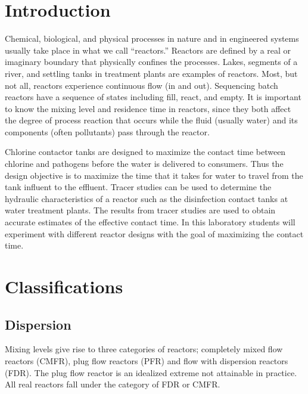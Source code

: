 \documentclass[letterpaper,10pt,english]{sphinxmanual}
\begin{document}
\section{Introduction}
\label{\detokenize{Reactor_Characteristics/Reactor_Characteristics:introduction}}\label{\detokenize{Reactor_Characteristics/Reactor_Characteristics:heading-reactor-introduction}}
Chemical, biological, and physical processes in nature and in engineered systems usually take place in what we call “reactors.” Reactors are defined by a real or imaginary boundary that physically confines the processes. Lakes, segments of a river, and settling tanks in treatment plants are examples of reactors. Most, but not all, reactors experience continuous flow (in and out). Sequencing batch reactors have a sequence of states including fill, react, and empty. It is important to know the mixing level and residence time in reactors, since they both affect the degree of process reaction that occurs while the fluid (usually water) and its components (often pollutants) pass through the reactor.

Chlorine contactor tanks are designed to maximize the contact time between chlorine and pathogens before the water is delivered to consumers. Thus the design objective is to maximize the time that it takes for water to travel from the tank influent to the effluent. Tracer studies can be used to determine the hydraulic characteristics of a reactor such as the disinfection contact tanks at water treatment plants. The results from tracer studies are used to obtain accurate estimates of the effective contact time. In this laboratory students will experiment with different reactor designs with the goal of maximizing the contact time.


\section{Classifications}
\label{\detokenize{Reactor_Characteristics/Reactor_Characteristics:classifications}}\label{\detokenize{Reactor_Characteristics/Reactor_Characteristics:heading-reactor-classifications}}

\subsection{Dispersion}
\label{\detokenize{Reactor_Characteristics/Reactor_Characteristics:dispersion}}
Mixing levels give rise to three categories of reactors; completely mixed flow reactors (CMFR), plug flow reactors (PFR) and flow with dispersion reactors (FDR). The plug flow reactor is an idealized extreme not attainable in practice. All real reactors fall under the category of FDR or CMFR.
\end{document}
